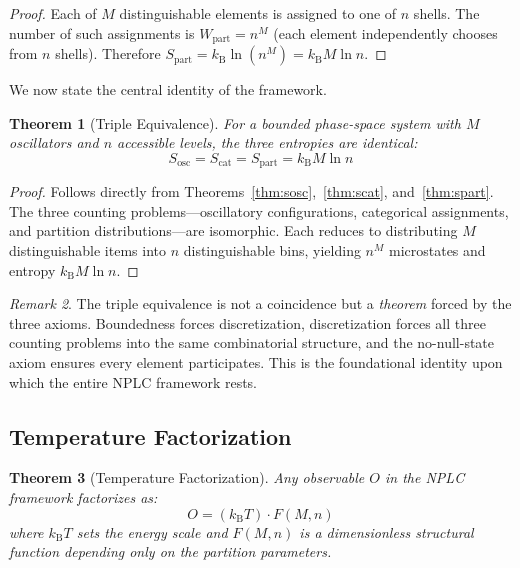 \documentclass[10pt,twocolumn]{article}
\newtheorem{theorem}{Theorem}[section]
\theoremstyle{remark}
\newtheorem{remark}[theorem]{Remark}
\newcommand{\kB}{k_{\mathrm{B}}}
\newcommand{\Sosc}{S_{\mathrm{osc}}}
\newcommand{\Scat}{S_{\mathrm{cat}}}
\newcommand{\Spart}{S_{\mathrm{part}}}
\begin{document}
\begin{proof}
Each of $M$ distinguishable elements is assigned to one of $n$ shells. The number of such assignments is $W_{\mathrm{part}} = n^M$ (each element independently chooses from $n$ shells). Therefore $\Spart = \kB \ln(n^M) = \kB M \ln n$.
\end{proof}

We now state the central identity of the framework.

\begin{theorem}[Triple Equivalence]
\label{thm:triple}
For a bounded phase-space system with $M$ oscillators and $n$ accessible levels, the three entropies are identical:
\begin{equation}
\boxed{\Sosc = \Scat = \Spart = \kB M \ln n}
\label{eq:triple}
\end{equation}
\end{theorem}

\begin{proof}
Follows directly from Theorems~\ref{thm:sosc},~\ref{thm:scat}, and~\ref{thm:spart}. The three counting problems---oscillatory configurations, categorical assignments, and partition distributions---are isomorphic. Each reduces to distributing $M$ distinguishable items into $n$ distinguishable bins, yielding $n^M$ microstates and entropy $\kB M \ln n$.
\end{proof}

\begin{remark}
The triple equivalence is not a coincidence but a \emph{theorem} forced by the three axioms. Boundedness forces discretization, discretization forces all three counting problems into the same combinatorial structure, and the no-null-state axiom ensures every element participates. This is the foundational identity upon which the entire NPLC framework rests.
\end{remark}

\subsection{Temperature Factorization}

\begin{theorem}[Temperature Factorization]
\label{thm:temp_factor}
Any observable $O$ in the NPLC framework factorizes as:
\begin{equation}
O = (\kB T) \cdot F(M, n)
\label{eq:temp_factor}
\end{equation}
where $\kB T$ sets the energy scale and $F(M,n)$ is a dimensionless structural function depending only on the partition parameters.
\end{theorem}
\end{document}
